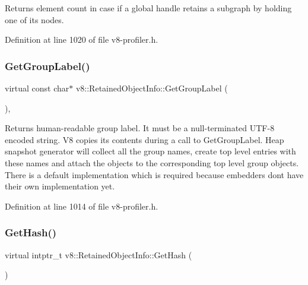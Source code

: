 Returns element count in case if a global handle retains a subgraph by holding one of its nodes. 

Definition at line 1020 of file v8-\/profiler.\+h.

\mbox{\label{classv8_1_1RetainedObjectInfo_adf835370c5516f2a89dd2d3f83dee10b}} 
\subsubsection{\texorpdfstring{Get\+Group\+Label()}{GetGroupLabel()}}
{\footnotesize\ttfamily virtual const char$\ast$ v8\+::\+Retained\+Object\+Info\+::\+Get\+Group\+Label (\begin{DoxyParamCaption}{ }\end{DoxyParamCaption})\hspace{0.3cm}{\ttfamily [inline]}, {\ttfamily [virtual]}}

Returns human-\/readable group label. It must be a null-\/terminated U\+T\+F-\/8 encoded string. V8 copies its contents during a call to Get\+Group\+Label. Heap snapshot generator will collect all the group names, create top level entries with these names and attach the objects to the corresponding top level group objects. There is a default implementation which is required because embedders don\textquotesingle{}t have their own implementation yet. 

Definition at line 1014 of file v8-\/profiler.\+h.

\mbox{\label{classv8_1_1RetainedObjectInfo_a6fdbfa242b95615e63f08433419c8066}} 
\subsubsection{\texorpdfstring{Get\+Hash()}{GetHash()}}
{\footnotesize\ttfamily virtual intptr\+\_\+t v8\+::\+Retained\+Object\+Info\+::\+Get\+Hash (\begin{DoxyParamCaption}{ }\end{DoxyParamCaption})\hspace{0.3cm}{\ttfamily [pure virtual]}}

